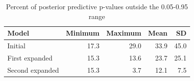 \begin{table}[ht]
\centering
\caption{Percent of posterior predictive p-values outside the 0.05-0.95 range} 
\label{tab:ppc}
\begin{tabular}{lrrrr}
  \hline
Model & Minimum & Maximum & Mean & SD \\ 
  \hline
Initial & 17.3 & 29.0 & 33.9 & 45.0 \\ 
  First expanded & 15.3 & 13.6 & 23.7 & 25.1 \\ 
  Second expanded & 15.3 & 3.7 & 12.1 & 7.5 \\ 
   \hline
\end{tabular}
\end{table}
